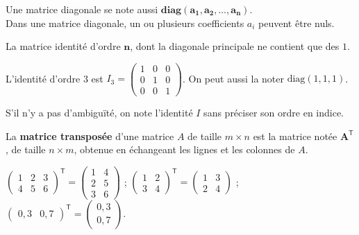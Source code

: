 \documentclass{cornouaille}
\begin{document}
\begin{remarque}
Une matrice diagonale  se note aussi $\boldsymbol{\text{diag}(a_1, a_2, \ldots, a_n)}$.\\
Dans une matrice diagonale, un ou plusieurs coefficients $a_{i}$ peuvent être  nuls.
\end{remarque}


\begin{definition}
La matrice identité d'ordre $\boldsymbol{n}$, dont la diagonale principale ne contient que des $1$.
\end{definition}

\begin{exemple}
L'identité d'ordre 3 est $I_3 = \begin{pmatrix}
1 & 0 & 0 \\
0 & 1 & 0 \\
0 & 0 & 1 \end{pmatrix}$. On peut aussi la noter $\mathrm{diag}(1, 1, 1)$.
\end{exemple}

\begin{remarque}
S'il n'y a pas d'ambiguïté, on note l'identité $I$ sans préciser son ordre en indice.
\end{remarque}



\begin{definition}
 La \textbf{matrice transposée} d'une matrice $A$ de taille  $m\times n$ est la matrice notée $\boldsymbol{A^\mathsf{T}}$,
 de taille  $n\times m$, obtenue en échangeant les lignes et les colonnes de $A$.
\end{definition}

\begin{exemple}
$\begin{pmatrix}1 & 2 & 3 \\ 4 & 5 & 6\end{pmatrix}^\mathsf{T}=\begin{pmatrix}1 & 4 \\ 2 & 5\\ 3 & 6 \end{pmatrix}$ \hspace{2mm} ; \hspace{2mm}
$\begin{pmatrix}1 & 2 \\ 3 & 4 \end{pmatrix}^\mathsf{T}=\begin{pmatrix}1 & 3 \\ 2 & 4 \end{pmatrix}$ \hspace{2mm} ; \hspace{2mm} $\begin{pmatrix}0,3 & 0,7\end{pmatrix}^\mathsf{T}=\begin{pmatrix}0,3 \\ 0,7  \end{pmatrix}$.
\end{exemple}
\end{document}
